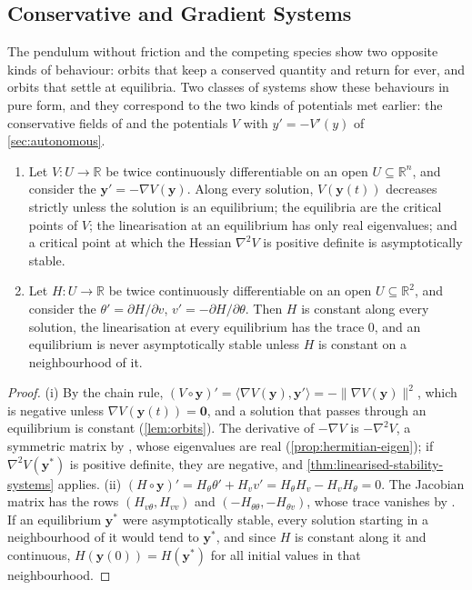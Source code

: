 \subsection{Conservative and Gradient Systems}

The pendulum without friction and the competing species show two opposite kinds of behaviour: orbits that keep a conserved quantity and return for ever, and orbits that settle at equilibria. Two classes of systems show these behaviours in pure form, and they correspond to the two kinds of potentials met earlier: the conservative fields of  and the potentials $V$ with $y'=-V'(y)$ of \cref{sec:autonomous}.

\begin{proposition}
\label{prop:gradient-hamiltonian}
\leavevmode
\begin{enumerate}
\item Let $V\colon U\to\mathbb R$ be twice continuously differentiable on an open $U\subseteq\mathbb R^n$, and consider the  $\mathbf y'=-\nabla V(\mathbf y)$. Along every solution, $V(\mathbf y(t))$ decreases strictly unless the solution is an equilibrium; the equilibria are the critical points of $V$; the linearisation at an equilibrium has only real eigenvalues; and a critical point at which the Hessian $\nabla^2V$ is positive definite is asymptotically stable.
\item Let $H\colon U\to\mathbb R$ be twice continuously differentiable on an open $U\subseteq\mathbb R^2$, and consider the  $\theta'=\partial H/\partial v$, $v'=-\partial H/\partial\theta$. Then $H$ is constant along every solution, the linearisation at every equilibrium has the trace $0$, and an equilibrium is never asymptotically stable unless $H$ is constant on a neighbourhood of it.
\end{enumerate}
\end{proposition}

\begin{proof}
(i) By the chain rule, $(V\circ\mathbf y)'=\langle\nabla V(\mathbf y),\mathbf y'\rangle=-\|\nabla V(\mathbf y)\|^2$, which is negative unless $\nabla V(\mathbf y(t))=\mathbf 0$, and a solution that passes through an equilibrium is constant (\cref{lem:orbits}). The derivative of $-\nabla V$ is $-\nabla^2V$, a symmetric matrix by , whose eigenvalues are real (\cref{prop:hermitian-eigen}); if $\nabla^2V(\mathbf y^*)$ is positive definite, they are negative, and \cref{thm:linearised-stability-systems} applies. (ii) $(H\circ\mathbf y)'=H_\theta\theta'+H_vv'=H_\theta H_v-H_vH_\theta=0$. The Jacobian matrix has the rows $(H_{v\theta},H_{vv})$ and $(-H_{\theta\theta},-H_{\theta v})$, whose trace vanishes by . If an equilibrium $\mathbf y^*$ were asymptotically stable, every solution starting in a neighbourhood of it would tend to $\mathbf y^*$, and since $H$ is constant along it and continuous, $H(\mathbf y(0))=H(\mathbf y^*)$ for all initial values in that neighbourhood.
\end{proof}

